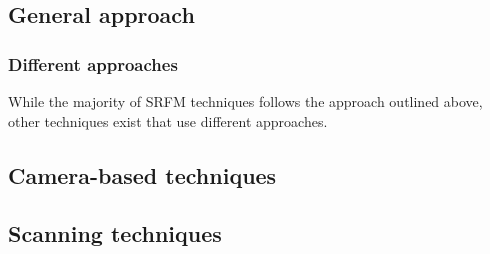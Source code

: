 


\subsection{General approach}

\subsubsection{Different approaches}
While the majority of SRFM techniques follows the approach outlined above,
other techniques exist that use different approaches.  


\subsection{Camera-based techniques}

\subsection{Scanning techniques}

